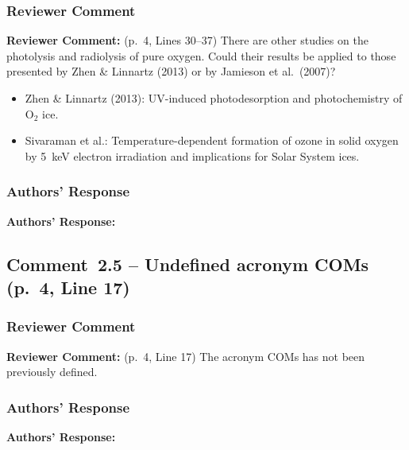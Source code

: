 \documentclass[12pt]{article}
\newcommand{\reviewlabel}{\textbf{\textcolor{commentframe}{Reviewer Comment:}}}
\newcommand{\responselabel}{\textbf{\textcolor{responseframe}{Authors' Response:}}}
\begin{document}
\subsubsection{Reviewer Comment}
\begin{reviewerbox}
\reviewlabel{} (p.~4, Lines 30--37) There are other studies on the photolysis
and radiolysis of pure oxygen. Could their results be applied to those
presented by Zhen \& Linnartz (2013) or by Jamieson et al.\ (2007)?
\begin{itemize}[nosep]
  \item Zhen \& Linnartz (2013): UV-induced photodesorption and photochemistry
        of O$_2$ ice.
  \item Sivaraman et al.: Temperature-dependent formation of ozone in solid
        oxygen by 5~keV electron irradiation and implications for Solar System
        ices.
\end{itemize}
\end{reviewerbox}

\subsubsection{Authors' Response}
\begin{responsebox}
\responselabel{}

\end{responsebox}

\subsection{Comment~2.5 -- Undefined acronym COMs (p.~4, Line 17)}

\subsubsection{Reviewer Comment}
\begin{reviewerbox}
\reviewlabel{} (p.~4, Line 17) The acronym COMs has not been previously
defined.
\end{reviewerbox}

\subsubsection{Authors' Response}
\begin{responsebox}
\responselabel{}

\end{responsebox}
\end{document}
